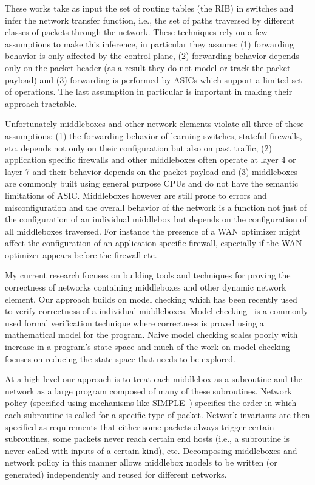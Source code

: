 \documentclass[letterpaper]{article}
\begin{document}
These works take as input the set of routing tables (the RIB) in switches and infer the network transfer function, i.e.,
the set of paths traversed by different classes of packets through the network. These techniques rely on a few
assumptions to make this inference, in particular they assume: (1) forwarding behavior is only affected by the control
plane, (2) forwarding behavior depends only on the packet header (as a result they do not model or track the packet
payload) and (3) forwarding is performed by ASICs which support a limited set of operations. The last assumption in
particular is important in making their approach tractable.

Unfortunately middleboxes and other network elements violate all three of these assumptions: (1) the forwarding behavior
of learning switches, stateful firewalls, etc. depends not only on their configuration but also on past traffic, (2)
application specific firewalls and other middleboxes often operate at layer 4 or layer 7 and their behavior depends on
the packet payload and (3) middleboxes are commonly built using general purpose CPUs and do not have the semantic
limitations of ASIC. Middleboxes however are still prone to errors and misconfiguration and the overall behavior of the
network is a function not just of the configuration of an individual middlebox but depends on the configuration of all
middleboxes traversed. For instance the presence of a WAN optimizer might affect the configuration of an application
specific firewall, especially if the WAN optimizer appears before the firewall etc. 

My current research focuses on building tools and techniques for proving the correctness of networks containing
middleboxes and other dynamic network element. Our approach builds on model checking which has been recently
used~\cite{dobrescu2014software} to verify correctness of a individual middleboxes. Model
checking~\cite{jhala2009software, han2007providing} is a commonly used formal verification technique where correctness
is proved using a mathematical model for the program.  Naive model checking scales poorly with increase in a program's
state space and much of the work on model checking focuses on reducing the state space that needs to be explored.

At a high level our approach is to treat each middlebox as a subroutine and the network as a large program composed of
many of these subroutines. Network policy (specified using mechanisms like SIMPLE~\cite{qazi2013simple}) specifies
the order in which each subroutine is called for a specific type of packet. Network invariants are then specified as
requirements that either some packets always trigger certain subroutines, some packets never reach certain end hosts
(i.e., a subroutine is never called with inputs of a certain kind), etc. Decomposing middleboxes and network policy in
this manner allows middlebox models to be written (or generated) independently and reused for different networks.
\end{document}
